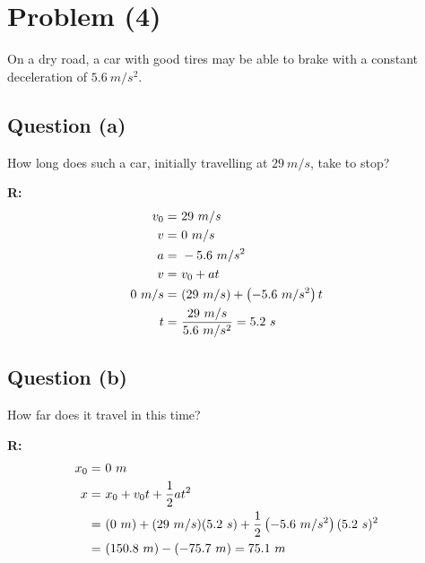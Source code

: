 \section{Problem (4)}
	On a dry road, a car with good tires may be able to brake with a constant deceleration of $5.6 \ m/s^{2}$.

	\subsection{Question (a)}
		How long does such a car, initially travelling at $29 \ m/s$, take to stop?

		\textbf{R:} \newline
		\begin{align}
			v_{0} = \ &29 \ m/s& \notag \\
			v = \ &0 \ m/s& \notag \\
			a = \ &- 5.6 \ m/s^{2}& \notag \\
			v = \ &v_{0} + at& \notag \\
			0 \ m/s = \ &(29 \ m/s) + \left( -5.6 \ m/s^{2} \right) t& \notag \\
			t = \ &\frac{29 \ m/s}{5.6 \ m/s^{2}} = 5.2 \ s&
		\end{align}
	\subsection{Question (b)}
		How far does it travel in this time?

		\textbf{R:} \newline
		\begin{align}
			x_{0} = \ &0 \ m& \notag \\
			x = \ &x_{0} + v_{0}t + \frac{1}{2}at^{2}& \notag \\
			= \ &(0 \ m) + (29 \ m/s)(5.2 \ s) + \frac{1}{2} \left( -5.6 \ m/s^{2} \right)(5.2 \ s)^{2}& \notag \\
			= \ &(150.8 \ m) - (-75.7 \ m) = 75.1 \ m&
		\end{align}
